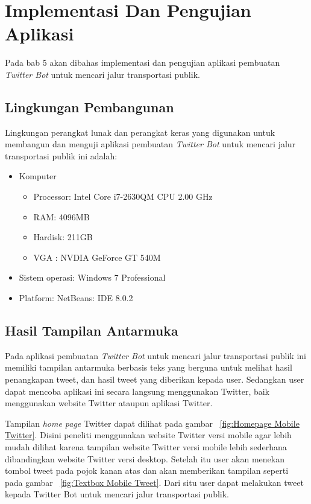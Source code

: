 \chapter{Implementasi Dan Pengujian Aplikasi}
\label{chap:implementasi dan pengujian aplikasi}

Pada bab 5 akan dibahas implementasi dan pengujian aplikasi pembuatan \textit{Twitter Bot} untuk mencari jalur transportasi publik.

\section{Lingkungan Pembangunan}
Lingkungan perangkat lunak dan perangkat keras yang digunakan untuk membangun dan menguji aplikasi pembuatan \textit{Twitter Bot} untuk mencari jalur transportasi publik ini adalah:
\begin{itemize}
	\item Komputer
	
	
	\begin{itemize}
		\item Processor: Intel Core i7-2630QM CPU 2.00 GHz
		\item RAM: 4096MB
		\item Hardisk: 211GB
		\item VGA : NVDIA GeForce GT 540M
	\end{itemize}
	\item Sistem operasi: Windows 7 Professional
	\item Platform: NetBeans: IDE 8.0.2
\end{itemize}

\section{Hasil Tampilan Antarmuka}
Pada aplikasi pembuatan \textit{Twitter Bot} untuk mencari jalur transportasi publik ini memiliki tampilan antarmuka berbasis teks yang berguna untuk melihat hasil penangkapan tweet, dan hasil tweet yang diberikan kepada user. Sedangkan user dapat mencoba aplikasi ini secara langsung menggunakan Twitter, baik menggunakan website Twitter ataupun aplikasi Twitter. 

Tampilan \textit{home page} Twitter dapat dilihat pada gambar ~\ref{fig:Homepage Mobile Twitter}. Disini peneliti menggunakan website Twitter versi mobile agar lebih mudah dilihat karena tampilan website Twitter versi mobile lebih sederhana dibandingkan website Twitter versi desktop. Setelah itu user akan menekan tombol tweet pada pojok kanan atas dan akan memberikan tampilan seperti pada gambar ~\ref{fig:Textbox Mobile Tweet}. Dari situ user dapat melakukan tweet kepada Twitter Bot untuk mencari jalur transportasi publik.

